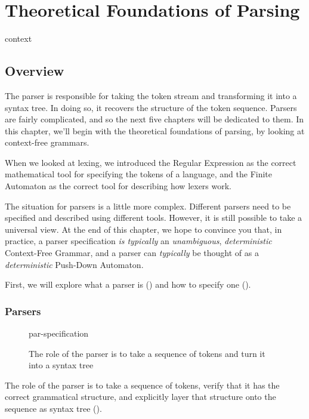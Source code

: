\chapter{Theoretical Foundations of Parsing}\label{chapter:parse-foundations}

\begin{center}
    {context}
\end{center}

\section{Overview}
The parser is responsible for taking the token stream and transforming it into a syntax tree. In doing so, it recovers the structure of the token sequence. Parsers are fairly complicated, and so the next five chapters will be dedicated to them. In this chapter, we'll begin with the theoretical foundations of parsing, by looking at context-free grammars.

When we looked at lexing, we introduced the Regular Expression as the correct mathematical tool for specifying the tokens of a language, and the Finite Automaton as the correct tool for describing how lexers work.

The situation for parsers is a little more complex. Different parsers need to be specified and described using different tools. However, it is still possible to take a universal view. At the end of this chapter, we hope to convince you that, in practice, a parser specification \textit{is typically} an \textit{unambiguous}, \textit{deterministic} Context-Free Grammar, and a parser can \textit{typically} be thought of as a \textit{deterministic} Push-Down Automaton. 

First, we will explore what a parser is () and how to specify one ().

\subsection{Parsers}\label{section:parsers}
\begin{figure}[h]
    \centering
    {par-specification}
    \caption{The role of the parser is to take a sequence of tokens and turn it into a syntax tree}
    \label{fig:par-specification}
\end{figure}

The role of the parser is to take a sequence of tokens, verify that it has the correct grammatical structure, and explicitly layer that structure onto the sequence as syntax tree ().

